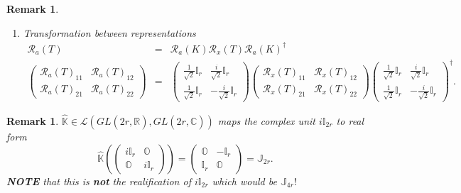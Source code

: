\documentclass[aps,preprint]{revtex4}
\newtheorem{remark}[theorem]{Remark}
\begin{document}
\begin{remark}
\begin{enumerate}
\item Transformation between representations 
\begin{eqnarray}
\mathcal{R}_{a}\left( T\right) &=&\mathcal{R}_{a}\left( K\right) \mathcal{R}%
_{x}\left( T\right) \mathcal{R}_{a}\left( K\right) ^{\dagger } \\
\left( 
\begin{array}{cc}
\mathcal{R}_{a}\left( T\right) _{11} & \mathcal{R}_{a}\left( T\right) _{12}
\\ 
\mathcal{R}_{a}\left( T\right) _{21} & \mathcal{R}_{a}\left( T\right) _{22}%
\end{array}%
\right) &=&\left( 
\begin{array}{cc}
\frac{1}{\sqrt{2}}\mathbb{I}_{r} & \frac{i}{\sqrt{2}}\mathbb{I}_{r} \\ 
\frac{1}{\sqrt{2}}\mathbb{I}_{r} & -\frac{i}{\sqrt{2}}\mathbb{I}_{r}%
\end{array}%
\right) \left( 
\begin{array}{cc}
\mathcal{R}_{x}\left( T\right) _{11} & \mathcal{R}_{x}\left( T\right) _{12}
\\ 
\mathcal{R}_{x}\left( T\right) _{21} & \mathcal{R}_{x}\left( T\right) _{22}%
\end{array}%
\right) \left( 
\begin{array}{cc}
\frac{1}{\sqrt{2}}\mathbb{I}_{r} & \frac{i}{\sqrt{2}}\mathbb{I}_{r} \\ 
\frac{1}{\sqrt{2}}\mathbb{I}_{r} & -\frac{i}{\sqrt{2}}\mathbb{I}_{r}%
\end{array}%
\right) ^{\dagger }.
\end{eqnarray}
\end{enumerate}
\end{remark}

\begin{remark}
$\widehat{\mathbb{K}}\in \mathcal{L}\left( GL\left( \overset{}{2r,\mathbb{R}}%
\right) ,GL\left( \overset{}{2r,\mathbb{C}}\right) \right) $ maps the
complex unit $i\mathbb{I}_{2r}$ to real form 
\begin{equation}
\widehat{\mathbb{K}}\left( \left( 
\begin{array}{cc}
i\mathbb{I}_{r} & \mathbb{O} \\ 
\mathbb{O} & i\mathbb{I}_{r}%
\end{array}%
\right) \right) =\left( 
\begin{array}{cc}
\mathbb{O} & -\mathbb{I}_{r} \\ 
\mathbb{I}_{r} & \mathbb{O}%
\end{array}%
\right) =\mathbb{J}_{2r}.
\end{equation}%
\textbf{NOTE} that this is \textbf{not} the realification of $i\mathbb{I}%
_{2r}$ which would be $\mathbb{J}_{4r}!$
\end{remark}
\end{document}
